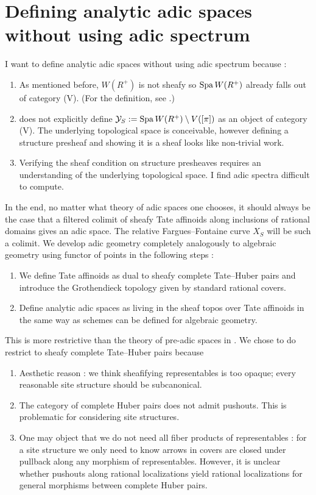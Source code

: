 \documentclass{article}
\begin{document}
\section{Defining analytic adic spaces without using adic spectrum}

I want to define analytic adic spaces without using adic spectrum
because : 
\begin{enumerate}
  \item As mentioned before, $W(R^+)$ is not sheafy so
  $\mathrm{Spa}\, W(R^+)$ already falls out of 
  category (V). (For the definition, see \cite[Def. 3.2.1]{SW20}.)
  \item \cite[Prop. 11.2.1]{SW20} does not explicitly define
  $\mathcal{Y}_S := \mathrm{Spa}\, W(R^+) \setminus V([\pi])$ 
  as an object of category (V).
  The underlying topological space is conceivable,
  however defining a structure presheaf and showing it is a sheaf
  looks like non-trivial work.
  \item Verifying the sheaf condition on structure presheaves
  requires an understanding of the underlying topological space.
  I find adic spectra difficult to compute.
\end{enumerate}
In the end,
no matter what theory of adic spaces one chooses,
it should always be the case that a filtered colimit of
sheafy Tate affinoids along inclusions of rational domains gives an adic space.
The relative Fargues--Fontaine curve $X_S$ will be such a colimit.
We develop adic geometry completely analogously to 
algebraic geometry using functor of points in the following steps : 
\begin{enumerate}
  \item We define Tate affinoids as
  dual to sheafy complete Tate--Huber pairs
  and introduce the Grothendieck topology given by 
  standard rational covers.
  \item
  Define analytic adic spaces as living in the sheaf topos over Tate affinoids
  in the same way as schemes can be defined for algebraic geometry.
\end{enumerate}
This is more restrictive than 
the theory of pre-adic spaces in \cite[Section 3.4]{SW20}.
We chose to do restrict to sheafy complete Tate--Huber pairs because 
\begin{enumerate}
  \item Aesthetic reason : we think sheafifying representables is too opaque;
  every reasonable site structure should be subcanonical.
  \item The category of complete Huber pairs
  does not admit pushouts.
  This is problematic for considering site structures.
  \item One may object that 
  we do not need all fiber products of representables : 
  for a site structure we only need to know arrows in covers
  are closed under pullback along any morphism of representables.
  However, it is unclear whether pushouts along rational localizations
  yield rational localizations for general
  morphisms between complete Huber pairs.
\end{enumerate}
\end{document}
